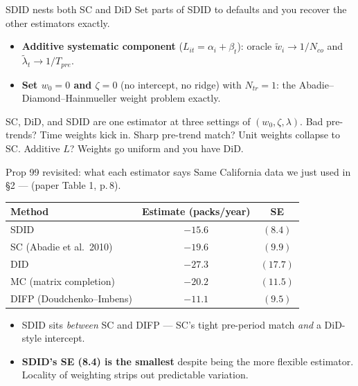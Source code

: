 \documentclass[aspectratio=169,11pt]{beamer}
\begin{document}
\begin{frame}{SDID nests both SC and DiD}
\footnotesize
Set parts of SDID to defaults and you recover the other estimators exactly.

\vspace{0.5em}
\begin{itemize}\setlength\itemsep{4pt}
  \item \textbf{Additive systematic component} ($L_{it} = \alpha_i + \beta_t$): \;oracle $\widetilde{w}_i \to 1/N_{co}$ and $\widetilde{\lambda}_t \to 1/T_{pre}$. \;
  \item \textbf{Set $w_0 = 0$ and $\zeta = 0$} (no intercept, no ridge) with $N_{tr}=1$: \;the Abadie--Diamond--Hainmueller weight problem exactly. \;
\end{itemize}

\vspace{0.6em}
 \;SC, DiD, and SDID are one estimator at three settings of $(w_0, \zeta, \lambda)$. \;Bad pre-trends? Time weights kick in. Sharp pre-trend match? Unit weights collapse to SC. Additive $L$? Weights go uniform and you have DiD.
\end{frame}

\begin{frame}{Prop 99 revisited: what each estimator says}
\footnotesize
Same California data we just used in \S2 ---  (paper Table 1, p.\,8).
\vspace{0.3em}
\begin{center}
\renewcommand{\arraystretch}{1.15}
\begin{tabular}{lcc}
\toprule
\textbf{Method} & \textbf{Estimate} (packs/year) & \textbf{SE} \\
\midrule
SDID & $-15.6$ & $(8.4)$ \\
SC (Abadie et al.\ 2010) & $-19.6$ & $(9.9)$ \\
DID & $-27.3$ & $(17.7)$ \\
MC (matrix completion) & $-20.2$ & $(11.5)$ \\
DIFP (Doudchenko--Imbens) & $-11.1$ & $(9.5)$ \\
\bottomrule
\end{tabular}
\end{center}
\vspace{0.4em}
\begin{itemize}\setlength\itemsep{2pt}
  \item SDID sits \textit{between} SC and DIFP --- SC's tight pre-period match \textit{and} a DiD-style intercept.
  \item \textbf{SDID's SE (8.4) is the smallest} despite being the more flexible estimator. \;Locality of weighting strips out predictable variation.
\end{itemize}
\end{frame}
\end{document}
